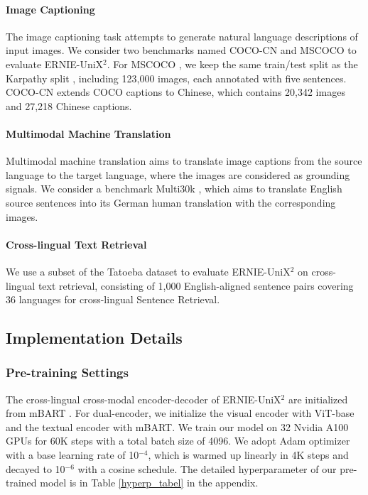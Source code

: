 \documentclass{article}
\begin{document}
\paragraph{Image Captioning}
The image captioning task attempts to generate natural language descriptions of input images. We consider two benchmarks named COCO-CN \cite{cococn} and MSCOCO \cite{mscoco} to evaluate ERNIE-UniX$^2$. For MSCOCO \cite{mscoco}, we keep the same train/test split as the Karpathy split \cite{Karpathy-split}, including 123,000 images, each annotated with five sentences. COCO-CN \cite{cococn} extends COCO captions to Chinese, which contains 20,342 images and 27,218 Chinese captions.
\paragraph{Multimodal Machine Translation}
Multimodal machine translation aims to translate image captions from the source language to the target language, where the images are considered as grounding signals. We consider a benchmark Multi30k \cite{elliott-etal-2016-multi30k}, which aims to translate English source sentences into its German human translation with the corresponding images.
\paragraph{Cross-lingual Text Retrieval}
We use a subset of the Tatoeba \cite{tatoeba} dataset to evaluate ERNIE-UniX$^2$ on cross-lingual text retrieval, consisting of 1,000 English-aligned sentence pairs covering 36 languages for cross-lingual Sentence Retrieval.
\subsection{Implementation Details}
\subsubsection{Pre-training Settings}
The cross-lingual cross-modal encoder-decoder of ERNIE-UniX$^{2}$ are initialized from mBART \cite{mbart}. For dual-encoder, we initialize the visual encoder with ViT-base \cite{vit2020} and the textual encoder with mBART. We train our model on 32 Nvidia A100 GPUs for 60K steps with a total batch size of 4096. We adopt Adam optimizer \cite{adamw} with a base learning rate of 10$^{-4}$, which is warmed up linearly in 4K steps and decayed to 10$^{-6}$ with a cosine schedule. The detailed hyperparameter of our pre-trained model is in Table \ref{hyperp_tabel} in the appendix.
\end{document}
